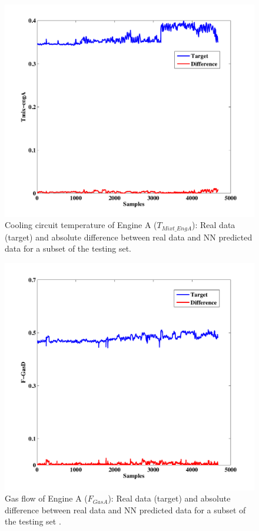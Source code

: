 \begin{figure}
\centering
\includegraphics[width=1\textwidth]{figures/TmixEngA.pdf}
\caption{Cooling circuit temperature of Engine A ($T_{Mixt\_EngA}$): Real data (target) and absolute difference between real data and NN predicted data for a subset of the testing set.}
\label{TcoolA}
\end{figure}

\begin{figure}
\centering
\includegraphics[width=1\textwidth]{figures/FGASD.pdf}
\caption{Gas flow  of Engine A ($F_{GasA}$): Real data (target) and absolute difference between real data and NN predicted data for a subset of the testing set .}
\label{FengineA}
\end{figure}

